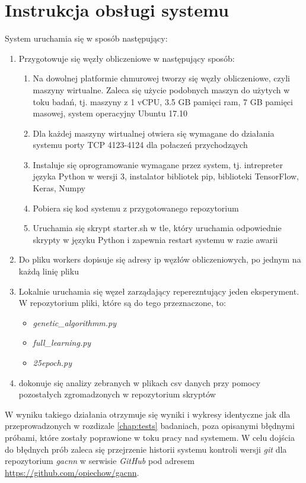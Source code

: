 \chapter[Dodatek C]{Instrukcja obsługi systemu}

System uruchamia się w sposób następujący:
\begin{enumerate}
  \item Przygotowuje się węzły obliczeniowe w następujący sposób:
  \begin{enumerate}
    \item Na dowolnej platformie chmurowej tworzy się węzły obliczeniowe, czyli maszyny wirtualne.
    Zaleca się użycie podobnych maszyn do użytych w toku badań, tj. maszyny z 1 vCPU, 3.5 GB pamięci ram, 7 GB pamięci masowej, system operacyjny Ubuntu 17.10
    \item Dla każdej maszyny wirtualnej otwiera się wymagane do działania systemu porty TCP 4123-4124 dla połaczeń przychodząych
    \item Instaluje się oprogramowanie wymagane przez system, tj. intrepreter języka Python w wersji 3, instalator bibliotek pip, biblioteki TensorFlow, Keras, Numpy
    \item Pobiera się kod systemu z przygotowanego repozytorium
    \item Uruchamia się skrypt starter.sh w tle, który uruchamia odpowiednie skrypty w języku Python i zapewnia restart systemu w razie awarii
  \end{enumerate}
  \item Do pliku workers dopisuje się adresy ip węzłów obliczeniowych, po jednym na każdą linię pliku
  \item Lokalnie uruchamia się węzeł zarządający reperezntujący jeden eksperyment.
  W repozytorium pliki, które są do tego przeznaczone, to:
  \begin{itemize}
    \item \textit{genetic\_algorithmm.py}
    \item \textit{full\_learning.py}
    \item \textit{25epoch.py}
  \end{itemize}
  \item dokonuje się analizy zebranych w plikach csv danych przy pomocy pozostałych zgromadzonych w repozytorium skryptów
\end{enumerate}
W wyniku takiego działania otrzymuje się wyniki i wykresy identyczne jak dla przeprowadzonych w rozdizale \ref{chap:tests} badaniach, poza opisanymi błędnymi próbami, które zostały poprawione w toku pracy nad systemem.
W celu dojścia do błędnych prób zaleca się przejrzenie historii systemu kontroli wersji \textit{git} dla repozytorium \textit{gacnn} w serwisie \textit{GitHub} pod adresem \url{https://github.com/opiechow/gacnn}.
